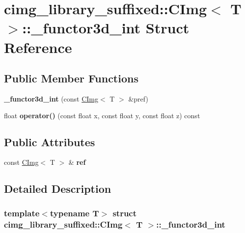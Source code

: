 \hypertarget{structcimg__library__suffixed_1_1CImg_1_1__functor3d__int}{}\section{cimg\+\_\+library\+\_\+suffixed\+:\+:C\+Img$<$ T $>$\+:\+:\+\_\+functor3d\+\_\+int Struct Reference}
\label{structcimg__library__suffixed_1_1CImg_1_1__functor3d__int}
\subsection*{Public Member Functions}
\begin{DoxyCompactItemize}
\item 
\mbox{\label{structcimg__library__suffixed_1_1CImg_1_1__functor3d__int_aa92ae8b290434512ecee05188c3d34cc}} 
{\bfseries \+\_\+functor3d\+\_\+int} (const \hyperlink{structcimg__library__suffixed_1_1CImg}{C\+Img}$<$ T $>$ \&pref)
\item 
\mbox{\label{structcimg__library__suffixed_1_1CImg_1_1__functor3d__int_a75c4ca89b7aa725ad9e5144606b31a98}} 
float {\bfseries operator()} (const float x, const float y, const float z) const
\end{DoxyCompactItemize}
\subsection*{Public Attributes}
\begin{DoxyCompactItemize}
\item 
\mbox{\label{structcimg__library__suffixed_1_1CImg_1_1__functor3d__int_a9706d22ee054bd7e0434e847989f6726}} 
const \hyperlink{structcimg__library__suffixed_1_1CImg}{C\+Img}$<$ T $>$ \& {\bfseries ref}
\end{DoxyCompactItemize}


\subsection{Detailed Description}
\subsubsection*{template$<$typename T$>$\newline
struct cimg\+\_\+library\+\_\+suffixed\+::\+C\+Img$<$ T $>$\+::\+\_\+functor3d\+\_\+int}



